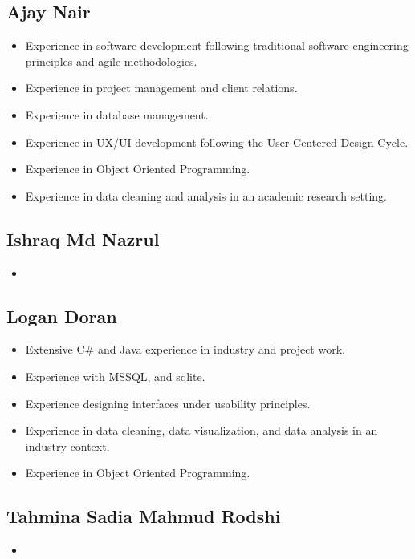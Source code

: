 \documentclass[12pt]{article}
\begin{document}
{\tiny\subsection*{Ajay Nair}}
\begin{itemize}
    \item Experience in software development following traditional software engineering principles and agile methodologies. 
    \item Experience in project management and client relations. 
    \item Experience in database management.
    \item Experience in UX/UI development following the User-Centered Design Cycle.
    \item Experience in Object Oriented Programming.
    \item Experience in data cleaning and analysis in an academic research setting.
\end{itemize}
{\tiny\subsection*{Ishraq Md Nazrul}}
\begin{itemize}
    \item 
\end{itemize}
{\tiny\subsection*{Logan Doran}}
\begin{itemize}
    \item Extensive C\# and Java experience in industry and project work. 
    \item Experience with MSSQL, and sqlite. 
    \item Experience designing interfaces under usability principles. 
    \item Experience in data cleaning, data visualization, and data analysis in an industry context. 
    \item Experience in Object Oriented Programming. 
\end{itemize}
{\tiny\subsection*{Tahmina Sadia Mahmud Rodshi}}
\begin{itemize}
    \item 
\end{itemize}
\end{document}
